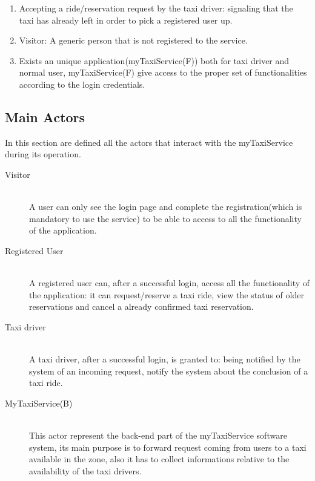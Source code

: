 \documentclass[11pt]{article} %
\begin{document}
\begin{enumerate}
        \item Accepting a ride/reservation request by the taxi driver: signaling that the taxi has already left in order to pick a registered user up.

        \item Visitor: A generic person that is not registered to the service.

        \item Exists an unique application(myTaxiService(F)) both for taxi driver and normal user, myTaxiService(F) give access to the proper set of functionalities
        according to the login credentials.
    \end{enumerate}

  \subsection{Main Actors}
    In this section are defined all the actors that interact with the myTaxiService during its operation.
    \begin{description}
      \item [Visitor] \hfill \\
          A user can only see the login page and complete the registration(which is mandatory to use the service)
          to be able to access to all the functionality of the application.

      \item [Registered User]\hfill \\
          A registered user can, after a successful login, access all the functionality of the application: it can
          request/reserve a taxi ride, view the status of older reservations and cancel a already confirmed taxi reservation.

      \item [Taxi driver] \hfill \\
          A taxi driver, after a successful login, is granted to: being notified by the system of an incoming request,
          notify the system about the conclusion of a taxi ride.

      \item [MyTaxiService(B)] \hfill \\
          This actor represent the back-end part of the myTaxiService software system, its main purpose is to forward request
          coming from users to a taxi available in the zone, also it has to collect informations relative to the availability
          of the taxi drivers.
    \end{description}
\end{document}
